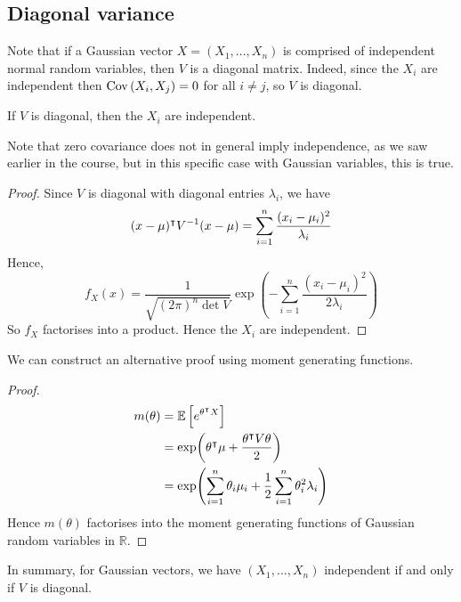 \subsection{Diagonal variance}
Note that if a Gaussian vector \(X = (X_1, \dots, X_n)\) is comprised of independent normal random variables, then \(V\) is a diagonal matrix.
Indeed, since the \(X_i\) are independent then \(\operatorname{Cov}\left({X_i, X_j}\right) = 0\) for all \(i \neq j\), so \(V\) is diagonal.
\begin{lemma}
	If \(V\) is diagonal, then the \(X_i\) are independent.
\end{lemma}
\noindent Note that zero covariance does not in general imply independence, as we saw earlier in the course, but in this specific case with Gaussian variables, this is true.
\begin{proof}
	Since \(V\) is diagonal with diagonal entries \(\lambda_i\), we have
	\[
		(x-\mu)^\intercal V^{-1} (x-\mu) = \sum_{i=1}^n \frac{(x_i - \mu_i)^2}{\lambda_i}
	\]
	Hence,
	\[
		f_X(x) = \frac{1}{\sqrt{(2\pi)^n \det V}} \exp(-\sum_{i=1}^n \frac{(x_i - \mu_i)^2}{2\lambda_i})
	\]
	So \(f_X\) factorises into a product.
	Hence the \(X_i\) are independent.
\end{proof}
\noindent We can construct an alternative proof using moment generating functions.
\begin{proof}
	\begin{align*}
		m(\theta) & = \mathbb{E}\left[{e^{\theta^\intercal X}}\right]                                                 \\
		          & = \exp(\theta^\intercal \mu + \frac{\theta^\intercal V \theta}{2})               \\
		          & = \exp(\sum_{i=1}^n \theta_i \mu_i + \frac{1}{2}\sum_{i=1}^n \theta_i^2 \lambda_i)
	\end{align*}
	Hence \(m(\theta)\) factorises into the moment generating functions of Gaussian random variables in \(\mathbb R\).
\end{proof}
\noindent In summary, for Gaussian vectors, we have \((X_1, \dots, X_n)\) independent if and only if \(V\) is diagonal.


